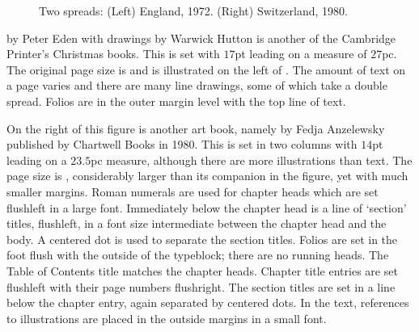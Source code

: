 \documentclass[10pt,a4paper,extrafontsizes]{memoir}
\begin{document}
\begin{figure}
\centering
\begin{minipage}[b]{\pwlayi}
\end{minipage}
\hfill
\begin{minipage}[b]{\pwlayi}
\end{minipage}
\caption[Two spreads: England, 1972 and Switzerland, 1980]%
        {Two spreads: (Left) England, 1972.
         (Right) Switzerland, 1980.} \label{fb:15}
\end{figure}

\begin{paracol}{2}
\switchEng
     by Peter Eden with drawings by
Warwick Hutton is another of the Cambridge 
Printer's Christmas books.
This is set with $17$pt leading on a measure of $27$pc. The original
page size is  and is illustrated on the left 
of . 
The amount of text on a page varies
and there are many line drawings, some of which take a double spread.
Folios are in the outer margin level with the top
line of text.

On the right of this figure is another art book, namely 
by Fedja Anzelewsky published by Chartwell Books in 1980. This is set in
two columns with $14$pt leading on a $23.5$pc measure, 
although there are more illustrations than text. The page
size is , considerably larger than its companion in
the figure, yet with much smaller margins.
Roman numerals are used for chapter heads which are
set flushleft in a large font. Immediately below the chapter head is a line
of `section' titles, flushleft, in a font size intermediate between the
chapter head and the body. A centered dot is used to separate the section
titles. Folios are set in the foot flush
with the outside of the typeblock; there are no running heads. 
The Table of Contents title matches the chapter heads.
Chapter title entries are set flushleft with their page numbers flushright.
The section titles are set in a line below the chapter entry, again separated
by centered dots. In the text, references to 
illustrations are placed in the outside margins in 
a small font.
\end{paracol}
\end{document}
